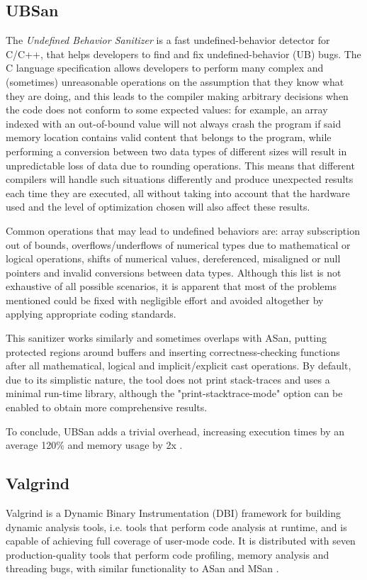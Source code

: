 \subsection{UBSan}
The \textit{Undefined Behavior Sanitizer} \cite{ubsan_docs} is a fast undefined-behavior detector for C/C++, that helps developers to find and fix undefined-behavior (UB) bugs. The C language specification allows developers to perform many complex and (sometimes) unreasonable operations on the assumption that they know what they are doing, and this leads to the compiler making arbitrary decisions when the code does not conform to some expected values: for example, an array indexed with an out-of-bound value will not always crash the program if said memory location contains valid content that belongs to the program, while performing a conversion between two data types of different sizes will result in unpredictable loss of data due to rounding operations. This means that different compilers will handle such situations differently and produce unexpected results each time they are executed, all without taking into account that the hardware used and the level of optimization chosen will also affect these results.

Common operations that may lead to undefined behaviors are: array subscription out of bounds, overflows/underflows of numerical types due to mathematical or logical operations, shifts of numerical values, dereferenced, misaligned or null pointers and invalid conversions between data types. Although this list is not exhaustive of all possible scenarios, it is apparent that most of the problems mentioned could be fixed with negligible effort and avoided altogether by applying appropriate coding standards.  

This sanitizer works similarly and sometimes overlaps with ASan, putting protected regions around buffers and inserting correctness-checking functions after all mathematical, logical and implicit/explicit cast operations. By default, due to its simplistic nature, the tool does not print stack-traces and uses a minimal run-time library, although the "print-stacktrace-mode" option can be enabled to obtain more comprehensive results.

To conclude, UBSan adds a trivial overhead, increasing execution times by an average 120\% and memory usage by 2x \cite{ubsan_docs}.



\subsection{Valgrind}
Valgrind is a Dynamic Binary Instrumentation (DBI) framework for building dynamic analysis tools, i.e. tools that perform code analysis at runtime, and is capable of achieving full coverage of user-mode code. It is distributed with seven production-quality tools that perform code profiling, memory analysis and threading bugs, with similar functionality to ASan and MSan \cite{valgrind_web}.  

